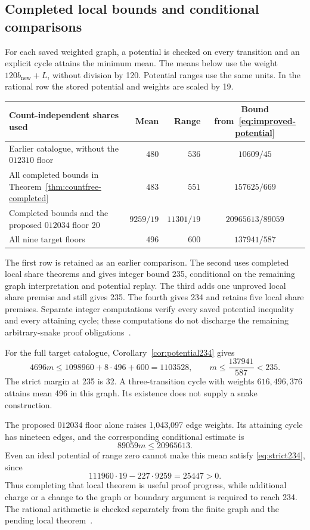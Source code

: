 \subsection{Completed local bounds and conditional comparisons}
For each saved weighted graph, a potential is checked on every transition and
an explicit cycle attains the minimum mean. The means below use the weight
$120b_{\mathrm{new}}+L$, without division by 120. Potential ranges use the same
units. In the rational row the stored potential and weights are scaled by 19.
\begin{center}\small
\begin{tabular}{p{}r r c}
\toprule
Count-independent shares used & Mean & Range & Bound from~\eqref{eq:improved-potential}\\\midrule
Earlier catalogue, without the $012310$ floor & $480$ & $536$ & $10609/45$\\
All completed bounds in Theorem~\ref{thm:countfree-completed} & $483$ & $551$ & $157625/669$\\
Completed bounds and the proposed $012034$ floor 20 & $9259/19$ & $11301/19$ & $20965613/89059$\\
All nine target floors & $496$ & $600$ & $137941/587$\\
\bottomrule
\end{tabular}
\end{center}
The first row is retained as an earlier comparison. The second uses completed
local share theorems and gives integer bound 235, conditional on the remaining
graph interpretation and potential replay. The third adds one unproved local
share premise and still gives 235. The fourth gives 234 and retains five local
share premises. Separate integer computations verify every saved potential
inequality and every attaining cycle; these computations do not discharge the
remaining arbitrary-snake proof obligations~\cite{countfreearchive,shareclosurearchive,targetsharearchive}.

For the full target catalogue, Corollary~\ref{cor:potential234} gives
\[
4696m\le1098960+8\cdot496+600=1103528,
\qquad m\le\frac{137941}{587}<235.
\]
The strict margin at 235 is 32. A three-transition cycle with weights
$616,496,376$ attains mean 496 in this graph. Its existence does not supply
a snake construction.

The proposed $012034$ floor alone raises 1,043,097 edge weights. Its attaining
cycle has nineteen edges, and the corresponding conditional estimate is
\[
89059m\le20965613.
\]
Even an ideal potential of range zero cannot make this mean satisfy
\eqref{eq:strict234}, since
\[
111960\cdot19-227\cdot9259=25447>0.
\]
Thus completing that local theorem is useful proof progress, while additional
charge or a change to the graph or boundary argument is required to reach
234. The rational arithmetic is checked separately from the finite graph and
the pending local theorem~\cite{targetsharearchive}.
